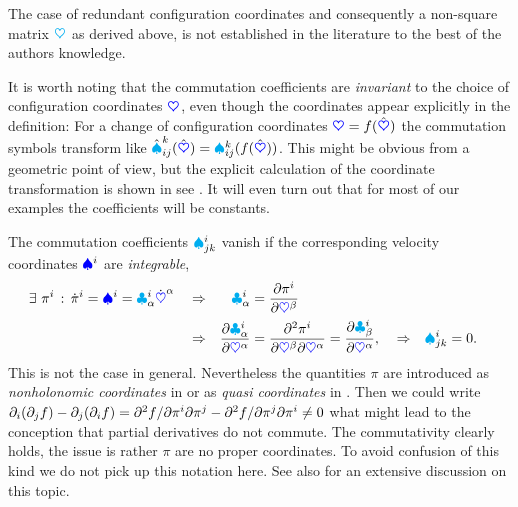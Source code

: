 The case of redundant configuration coordinates and consequently a non-square matrix $\kinMat$ as derived above, is not established in the literature to the best of the authors knowledge.

It is worth noting that the commutation coefficients are \textit{invariant} to the choice of configuration coordinates $\sysCoord$, even though the coordinates appear explicitly in the definition:
For a change of configuration coordinates $\sysCoord = f(\sysCoordW)$ the commutation symbols transform like $\BoltzSymW{\LidxIII}{\LidxI}{\LidxII}(\sysCoordW) = \BoltzSym{\LidxIII}{\LidxI}{\LidxII}(f(\sysCoordW))$.
This might be obvious from a geometric point of view, but the explicit calculation of the coordinate transformation is shown in see .
It will even turn out that for most of our examples the coefficients will be constants.

The commutation coefficients $\BoltzSym{\LidxI}{\LidxII}{\LidxIII}$ vanish if the corresponding velocity coordinates $\sysVelCoeff{\LidxI}$ are \textit{integrable}, \ie
\begin{align}
 \exists \ \pi^\LidxI \, : \, \dot{\pi}^\LidxI &= \sysVelCoeff{\LidxI} = \kinBasisMatCoeff{\LidxI}{\GidxI} \sysCoordCoeffd{\GidxI}&
 &\Rightarrow&
  \kinBasisMatCoeff{\LidxI}{\GidxI} &= \pdiff[\pi^i]{\sysCoordCoeff{\GidxII}}
\nonumber\\
&&
&\Rightarrow&
 \pdiff[\kinBasisMatCoeff{\LidxI}{\GidxI}]{\sysCoordCoeff{\GidxI}}
 &= \frac{\partial^2 \pi^i}{\partial \sysCoordCoeff{\GidxII} \partial \sysCoordCoeff{\GidxI}}
 = \pdiff[\kinBasisMatCoeff{\LidxI}{\beta}]{\sysCoordCoeff{\GidxI}},&
&\Rightarrow&
 \BoltzSym{\LidxI}{\LidxII}{\LidxIII} &= 0.
\end{align}
This is not the case in general.
Nevertheless the quantities $\pi$ are introduced as \textit{nonholonomic coordinates} in \cite{Boltzmann:NonholCoord} or as \textit{quasi coordinates} in \cite[sec.\,1.5]{Lurie:AnalyticalMechanics}.
Then we could write $\partial_\LidxI (\partial_\LidxII f) - \partial_\LidxII (\partial_\LidxI f) = \sfrac{\partial^2 f}{\partial \pi^\LidxI \partial \pi^\LidxII} - \sfrac{\partial^2 f}{\partial \pi^\LidxII \partial \pi^\LidxI} \neq 0$ what might lead to the conception that partial derivatives do not commute.
The commutativity clearly holds, the issue is rather $\pi$ are no proper coordinates.
To avoid confusion of this kind we do not pick up this notation here.
See also \cite{Hamel:virtuelleVerschiebungen} for an extensive discussion on this topic.


